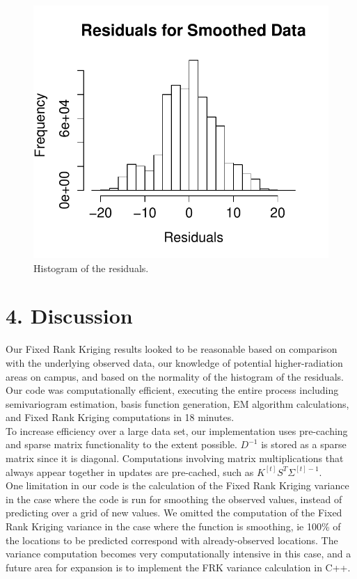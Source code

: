 \documentclass[11pt]{article}
\begin{document}
\begin{figure}[H]
\centering
\includegraphics[width=0.5\columnwidth]{Images/Residuals_for_smoothing}
\caption{Histogram of the residuals.}
\label{fig:10}
\end{figure}


\newpage
\section{4. Discussion}

Our Fixed Rank Kriging results looked to be reasonable based on comparison with the underlying observed data, our knowledge of potential higher-radiation areas on campus, and based on the normality of the histogram of the residuals.  Our code was computationally efficient, executing the entire process including semivariogram estimation, basis function generation, EM algorithm calculations, and Fixed Rank Kriging computations in 18 minutes.\\

To increase efficiency over a large data set, our implementation uses pre-caching and sparse matrix functionality to the extent possible.  $D^{-1}$ is stored as a sparse matrix since it is diagonal.  Computations involving matrix multiplications that always appear together in updates are pre-cached, such as $K^{[t]}S^T\Sigma^{[t]-1}$.\\

One limitation in our code is the calculation of the Fixed Rank Kriging variance in the case where the code is run for smoothing the observed values, instead of predicting over a grid of new values.  We omitted the computation of the Fixed Rank Kriging variance in the case where the function is smoothing, ie 100\% of the locations to be predicted correspond with already-observed locations.  The variance computation becomes very computationally intensive in this case, and a future area for expansion is to implement the FRK variance calculation in C++.\\
\end{document}
